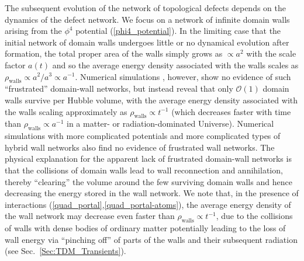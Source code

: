 \documentclass[aps,prd,onecolumn,nofootinbib]{revtex4-2} %
\begin{document}
The subsequent evolution of the network of topological defects depends on the dynamics of the defect network. 
We focus on a network of infinite domain walls arising from the $\phi^4$ potential (\ref{phi4_potential}). 
In the limiting case that the initial network of domain walls undergoes little or no dynamical evolution after formation, the total proper area of the walls simply grows as $\propto a^2$ with the scale factor $a(t)$ and so the average energy density associated with the walls scales as $\rho_\textrm{walls} \propto a^2/a^3 \propto a^{-1}$. 
Numerical simulations \cite{Spergel_1989_walls,Hindmarsh2003walls,Avelino2004walls,Avelino2005walls}, however, show no evidence of such ``frustrated'' domain-wall networks, but instead reveal that only $\mathcal{O}(1)$ domain walls survive per Hubble volume, with the average energy density associated with the walls scaling approximately as $\rho_\textrm{walls} \propto t^{-1}$ (which decreases faster with time than $\rho_\textrm{walls} \propto a^{-1}$ in a matter- or radiation-dominated Universe). 
Numerical simulations with more complicated potentials and more complicated types of hybrid wall networks \cite{Avelino2006walls,Avelino2010walls} also find no evidence of frustrated wall networks. 
The physical explanation for the apparent lack of frustrated domain-wall networks is that the collisions of domain walls lead to wall reconnection and annihilation, thereby ``clearing'' the volume around the few surviving domain walls and hence decreasing the energy stored in the wall network. 
We note that, in the presence of interactions (\ref{quad_portal},\ref{quad_portal-atoms}), the average energy density of the wall network may decrease even faster than $\rho_\textrm{walls} \propto t^{-1}$, due to the collisions of walls with dense bodies of ordinary matter potentially leading to the loss of wall energy via ``pinching off'' of parts of the walls and their subsequent radiation (see Sec.~\ref{Sec:TDM_Transients}). 
\end{document}
